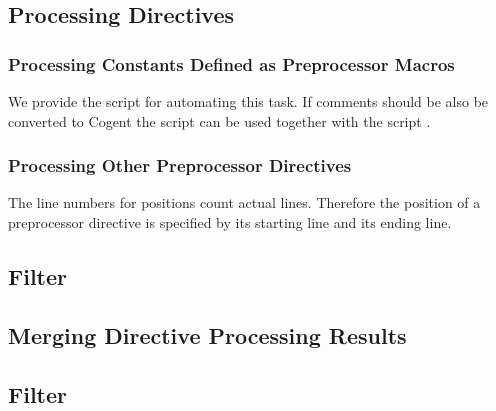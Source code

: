 \subsection{Processing Directives}

\subsubsection{Processing Constants Defined as Preprocessor Macros}

We provide the script  for automating this task. If comments should be also be converted to Cogent 
the script can be used together with the script .

\subsubsection{Processing Other Preprocessor Directives}

The line numbers for positions count actual lines. Therefore the position of a preprocessor directive is specified by its starting line and its ending line. 

\subsection{Filter }

\subsection{Merging Directive Processing Results}

\subsection{Filter }

 
